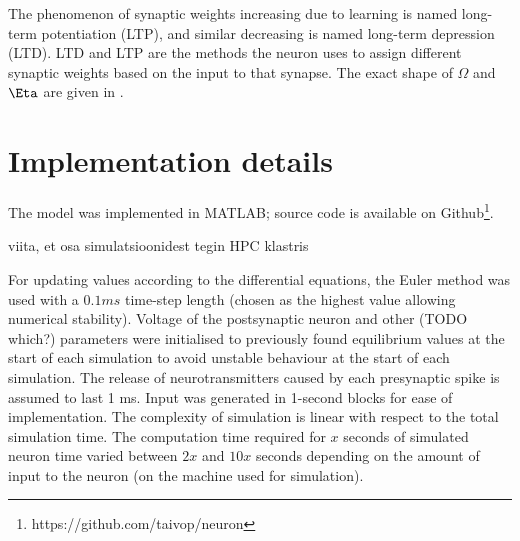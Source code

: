 \documentclass[a4paper,12pt]{report}
\theoremstyle{definition}
\begin{document}
The phenomenon of synaptic weights increasing due to learning is named long-term potentiation (LTP), and similar decreasing is named long-term depression (LTD). LTD and LTP are the methods the neuron uses to assign different synaptic weights based on the input to that synapse. The exact shape of $\Omega$ and $\Eta$ are given in \cite{shouval2002unified}.























\section{Implementation details}

The model was implemented in MATLAB; source code is available on Github\footnote{https://github.com/taivop/neuron}.

viita, et osa simulatsioonidest tegin HPC klastris

For updating values according to the differential equations, the Euler method was used with a $0.1ms$ time-step length (chosen as the highest value allowing numerical stability). Voltage of the postsynaptic neuron and other (TODO which?) parameters were initialised to previously found equilibrium values at the start of each simulation to avoid unstable behaviour at the start of each simulation. The release of neurotransmitters caused by each presynaptic spike is assumed to last 1 ms. Input was generated in 1-second blocks for ease of implementation. The complexity of simulation is linear with respect to the total simulation time. The computation time required for $x$ seconds of simulated neuron time varied between $2x$ and $10x$ seconds depending on the amount of input to the neuron (on the machine used for simulation).
\end{document}
